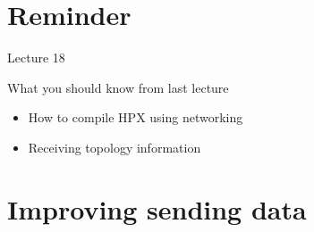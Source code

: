 \documentclass[12pt,t]{beamer}
\title{\coursename}
\subtitle{Lecture 19: Distributed implementation of the heat equation II}
\date {
 \tiny \url{\courseurl}
\vspace{2cm}
\doclicenseThis  
  
}
\begin{document}
 {
    \frame {
        \titlepage
    }
}

\frame{

\tableofcontents

}


\section{Reminder}
\begin{frame}{Lecture 18}
\begin{block}{What you should know from last lecture}
\begin{itemize}
\item How to compile HPX using networking
\item Receiving topology information
\end{itemize}
\end{block}
\end{frame}

\section{Improving sending data}
\end{document}
